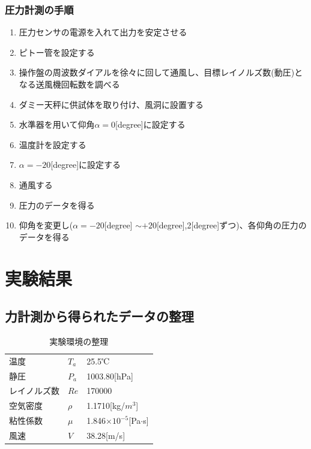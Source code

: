 \documentclass[a4j,twoside,openright,11pt]{jarticle}
\begin{document}
\subsubsection{圧力計測の手順}

\begin{enumerate}
\item 圧力センサの電源を入れて出力を安定させる
\item ピトー管を設定する
\item 操作盤の周波数ダイアルを徐々に回して通風し、目標レイノルズ数(動圧)となる送風機回転数を調べる
\item ダミー天秤に供試体を取り付け、風洞に設置する
\item 水準器を用いて仰角$\alpha = 0$[degree]に設定する
\item 温度計を設定する
\item $\alpha = -20$[degree]に設定する
\item 通風する
\item 圧力のデータを得る
\item 仰角を変更し($\alpha = -20$[degree] $\sim +20$[degree],2[degree]ずつ)、各仰角の圧力のデータを得る
\end{enumerate}

\section{実験結果}
\subsection{力計測から得られたデータの整理}
\begin{table}[htb]
\begin{center}
  \caption{実験環境の整理}
  \begin{tabular}{lll} \hline
温度        &$T_a$  &25.5℃\\
静圧        &$P_a$  &1003.80[hPa]\\
レイノルズ数&$Re$   &170000\\
空気密度    &$\rho$ &1.1710[kg/$m^3$]\\
粘性係数    &$\mu$  &1.846$\times 10^{-5}$[Pa$\cdot$s]\\
風速        &$V$    &38.28[m/s]\\
\hline
  \end{tabular}
\end{center}
\end{table}
\end{document}
